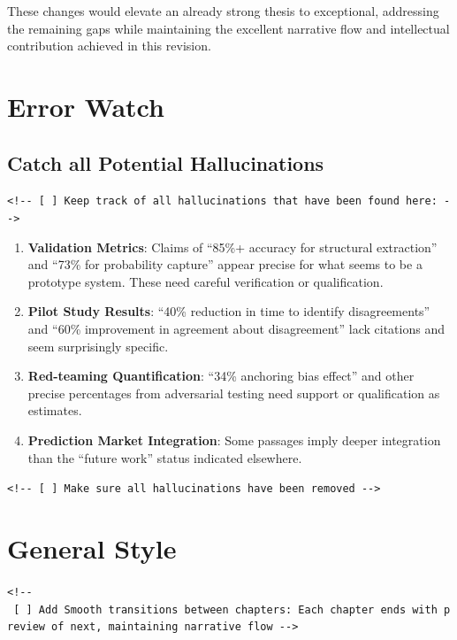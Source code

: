 \documentclass[
  11pt,
  letterpaper,
]{book}
\begin{document}
These changes would elevate an already strong thesis to exceptional,
addressing the remaining gaps while maintaining the excellent narrative
flow and intellectual contribution achieved in this revision.

\section{Error Watch}\label{error-watch}

\subsection{Catch all Potential
Hallucinations}\label{catch-all-potential-hallucinations}

\texttt{\textless{}!-\/-\ {[}\ {]}\ Keep\ track\ of\ all\ hallucinations\ that\ have\ been\ found\ here:\ -\/-\textgreater{}}

\begin{enumerate}
\def\labelenumi{\arabic{enumi}.}
\item
  \textbf{Validation Metrics}: Claims of ``85\%+ accuracy for structural
  extraction'' and ``73\% for probability capture'' appear precise for
  what seems to be a prototype system. These need careful verification
  or qualification.
\item
  \textbf{Pilot Study Results}: ``40\% reduction in time to identify
  disagreements'' and ``60\% improvement in agreement about
  disagreement'' lack citations and seem surprisingly specific.
\item
  \textbf{Red-teaming Quantification}: ``34\% anchoring bias effect''
  and other precise percentages from adversarial testing need support or
  qualification as estimates.
\item
  \textbf{Prediction Market Integration}: Some passages imply deeper
  integration than the ``future work'' status indicated elsewhere.
\end{enumerate}

\texttt{\textless{}!-\/-\ {[}\ {]}\ Make\ sure\ all\ hallucinations\ have\ been\ removed\ -\/-\textgreater{}}

\section{General Style}\label{general-style}

\texttt{\textless{}!-\/-\ {[}\ {]}\ Add\ Smooth\ transitions\ between\ chapters:\ Each\ chapter\ ends\ with\ preview\ of\ next,\ maintaining\ narrative\ flow\ -\/-\textgreater{}}
\end{document}
